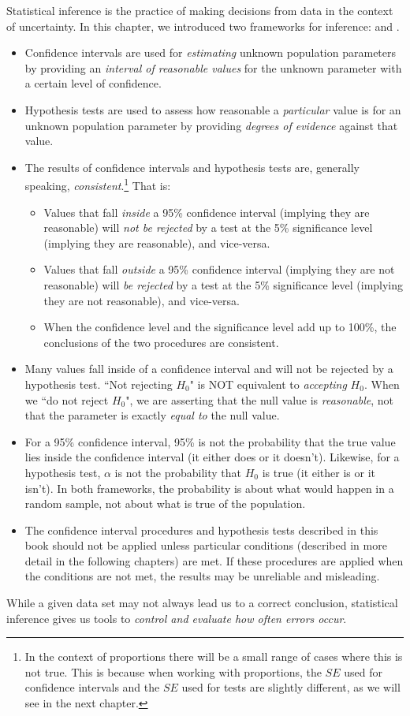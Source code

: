 \noindent Statistical inference is the practice of making decisions from data in the context of uncertainty.  In this chapter, we introduced two frameworks for inference:   and .   
\begin{itemize}
\item Confidence intervals are used for \textit{estimating} unknown population parameters by providing an \textit{interval of reasonable values} for the unknown parameter with a certain level of confidence.
\item Hypothesis tests are used to assess how reasonable a \textit{particular} value is for an unknown population parameter by providing \textit{degrees of evidence} against that value.
\item The results of confidence intervals and hypothesis tests are, generally speaking, \textit{consistent}.\footnote{In the context of proportions there will be a small range of cases where this is not true.  This is because when working with proportions, the $SE$ used for confidence intervals and the $SE$ used for tests are slightly different, as we will see in the next chapter.}  That is:\vspace{-1mm}
\begin{itemize}
\item Values that fall \textit{inside} a 95\% confidence interval (implying they are reasonable) will \textit{not be rejected} by a test at the 5\% significance level (implying they are reasonable), and vice-versa.  
\item Values that fall \textit{outside} a 95\% confidence interval (implying they are not reasonable) will \textit{be rejected} by a test at the 5\% significance level (implying they are not reasonable), and vice-versa.
\item When the confidence level and the significance level add up to 100\%, the conclusions of the two procedures are consistent.
\end{itemize}
\item Many values fall inside of a confidence interval and will not be rejected by a hypothesis test. ``Not rejecting $H_0$" is NOT equivalent to \textit{accepting} $H_0$.   When we ``do not reject $H_0$", we are asserting that the null value is \textit{reasonable}, not that the parameter is exactly \emph{equal to} the null value.
\item For a 95\% confidence interval, 95\% is not the probability that the true value lies inside the confidence interval (it either does or it doesn't).  Likewise, for a hypothesis test, $\alpha$ is not the probability that $H_0$ is true (it either is or it isn't).  In both frameworks, the probability is about what would happen in a random sample, not about what is true of the population.  
\item The confidence interval procedures and hypothesis tests described in this book should not be applied unless particular conditions (described in more detail in the following chapters) are met.  If these procedures are applied when the conditions are not met, the results may be unreliable and misleading.  
\end{itemize}
 While a given data set may not always lead us to a correct conclusion, statistical inference gives us tools to \textit{control and evaluate how often errors occur}.


